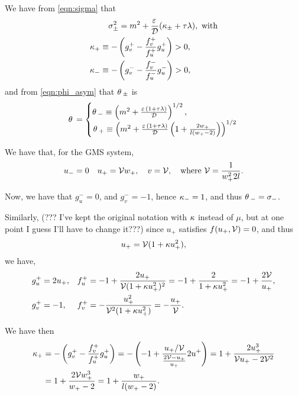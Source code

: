 We have from \eqref{eqn:sigma} that
% 
\begin{equation*}
\begin{split}
	&\quad\sigma_{\pm}^2 = m^2  + \frac{\varepsilon\,}{\mathcal{D}}(\kappa_{\pm} + \tau\lambda), \text{ with}\\
	\kappa_+ &\equiv - \left(g_v^+ - \frac{f_v^+}{f_u^+}g_u^+ \right)>0,\\
	\kappa_- &\equiv - \left(g_v^- - \frac{f_v^-}{f_u^-}g_u^- \right)>0,
\end{split}
\end{equation*}
% 
and from \eqref{eqn:phi_asym} that $\theta\,_{\pm}$ is
% 
\begin{equation*}
	\begin{split}
	\theta\,
   = \left\{
	\begin{matrix}
		\theta\,_-\equiv\left(m^2+\frac{\varepsilon\,(1+\tau\lambda)}{\mathcal{D}}\right)^{1/2},\hspace{0.85in}\\
		\theta\,_+\equiv\left(m^2+\frac{\varepsilon\,(1+\tau\lambda)}{\mathcal{D}}\left(1+\frac{2w_+}{l(w_+-2)} \right)\right)^{1/2}
	\end{matrix}\right.
	\end{split}
\end{equation*}
% 

We have that, for the GMS system,
% 
\[
  u_-=0\quad u_+ = \mathcal{V} w_+,\quad v=\mathcal{V},\quad\text{where }\mathcal{V} = \frac{1}{w_+^22l}.
\]
% 

Now, we have that $g_u^- = 0$, and $g_v^- = -1$, hence $\kappa_- = 1$, and thus $\theta\,_- = \sigma_-$.

Similarly, (??? I've kept the original notation with $\kappa$ instead of $\mu$, but at one point I guess I'll have to change it???) since $u_+$ satisfies $f(u_+,\mathcal{V})=0$, and thus
% 
\[
  u_+ = \mathcal{V}(1+\kappa u_+^2),
\]
% 
we have,
% 
\[
\begin{split}
\begin{aligned}
  g_u^+ &= 2u_+, && f_u^+ = -1+\frac{2u_+}{\mathcal{V}(1+\kappa u_+^2)^2} = -1 + \frac{2}{1+\kappa u_+^2} = -1+\frac{2\mathcal{V}}{u_+},\\
  g_v^+ &= -1,&& f_v^+ = -\frac{u_+^2}{\mathcal{V}^2(1+\kappa u_+^2)} = -\frac{u_+}{\mathcal{V}}.
\end{aligned}
\end{split}
\]
% 

We have then
% 
\[
\begin{split}
  \kappa_+ &= -\left(g_v^+ - \frac{f_v^+}{f_u^+}g_u^+ \right) = -\left(-1 +  \frac{u_+/\mathcal{V}}{\frac{2\mathcal{V}-u_+}{u_+}}2u^+ \right) = 1+\frac{2u_+^3}{\mathcal{V} u_+-2\mathcal{V}^2}\\
  & = 1+\frac{2\mathcal{V} w_+^3}{w_+-2} = 1+\frac{ w_+}{l(w_+-2)}.
\end{split}
\]
 
